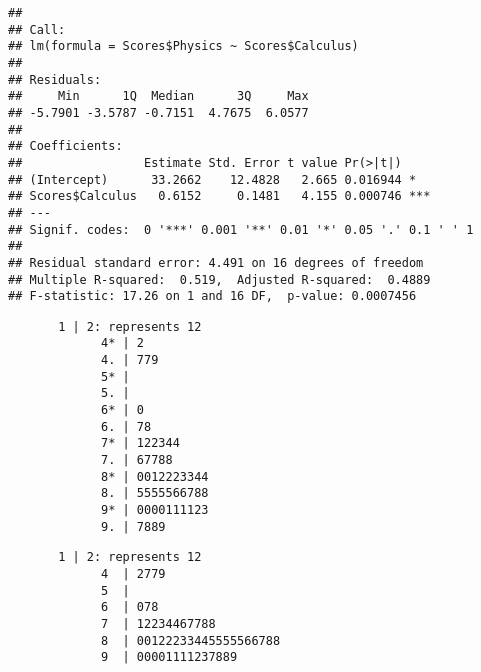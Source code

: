 \documentclass{article}\usepackage[]{graphicx}\usepackage[]{color}
\makeatletter
\newenvironment{kframe}{%
 \def\at@end@of@kframe{}%
 \ifinner\ifhmode%
  \def\at@end@of@kframe{\end{minipage}}%
  \begin{minipage}{\columnwidth}%
 \fi\fi%
 \def\FrameCommand##1{\hskip\@totalleftmargin \hskip-\fboxsep
 \colorbox{shadecolor}{##1}\hskip-\fboxsep
     \hskip-\linewidth \hskip-\@totalleftmargin \hskip\columnwidth}%
 \MakeFramed {\advance\hsize-\width
   \@totalleftmargin\z@ \linewidth\hsize
   \@setminipage}}%
 {\par\unskip\endMakeFramed%
 \at@end@of@kframe}
\newenvironment{knitrout}{}{} %
\makeatother
\begin{document}
\begin{knitrout}
\color{fgcolor}\begin{kframe}
\begin{verbatim}
## 
## Call:
## lm(formula = Scores$Physics ~ Scores$Calculus)
## 
## Residuals:
##     Min      1Q  Median      3Q     Max 
## -5.7901 -3.5787 -0.7151  4.7675  6.0577 
## 
## Coefficients:
##                 Estimate Std. Error t value Pr(>|t|)    
## (Intercept)      33.2662    12.4828   2.665 0.016944 *  
## Scores$Calculus   0.6152     0.1481   4.155 0.000746 ***
## ---
## Signif. codes:  0 '***' 0.001 '**' 0.01 '*' 0.05 '.' 0.1 ' ' 1
## 
## Residual standard error: 4.491 on 16 degrees of freedom
## Multiple R-squared:  0.519,	Adjusted R-squared:  0.4889 
## F-statistic: 17.26 on 1 and 16 DF,  p-value: 0.0007456
\end{verbatim}
\end{kframe}
\end{knitrout}

\begin{knitrout}
\color{fgcolor}\begin{kframe}
\begin{verbatim}
       1 | 2: represents 12 
             4* | 2
             4. | 779
             5* |
             5. |             
             6* | 0
             6. | 78
             7* | 122344
             7. | 67788
             8* | 0012223344
             8. | 5555566788
             9* | 0000111123
             9. | 7889
\end{verbatim}
\end{kframe}
\end{knitrout}

\begin{knitrout}
\color{fgcolor}\begin{kframe}
\begin{verbatim}
       1 | 2: represents 12 
             4  | 2779
             5  |             
             6  | 078
             7  | 12234467788 
             8  | 00122233445555566788
             9  | 00001111237889 
\end{verbatim}
\end{kframe}
\end{knitrout}
\end{document}
